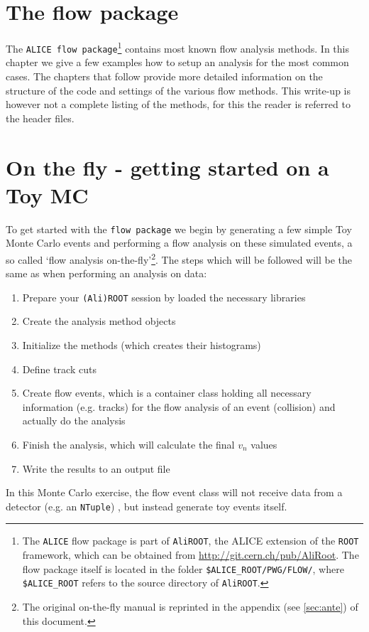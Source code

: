 \documentclass[a4paper]{book}
\numberwithin{equation}{subsection}
\begin{document}
\section{The flow package}
\label{quickstart}
The \texttt{ALICE flow package}\footnote{The \texttt{ALICE} flow package is part of \texttt{AliROOT}, the ALICE extension of the \texttt{ROOT} framework, which can be obtained from \href{http://git.cern.ch/pub/AliRoot}{http://git.cern.ch/pub/AliRoot}. The flow package itself is located in the folder \texttt{\$ALICE\_ROOT/PWG/FLOW/}, where \texttt{\$ALICE\_ROOT} refers to the source directory of \texttt{AliROOT}.} 
contains most known flow analysis methods.  In this chapter we give a few examples how to setup an
analysis for the most common cases. The chapters that follow provide more detailed information on the structure of the code 
and settings of the various flow methods. 
This write-up is however not a complete listing of the methods, for this the reader is referred to the header files.
 
\section{On the fly - getting started on a Toy MC}
To get started with the \texttt{flow package} we begin by generating a few simple Toy Monte Carlo events and performing a flow analysis on these simulated events, a so called `flow analysis on-the-fly'\footnote{The original on-the-fly manual is reprinted in the appendix (see \ref{sec:ante}) of this document.}. The steps which will be followed will be the same as when performing an analysis on data: 
\begin{enumerate}
\item Prepare your \texttt{(Ali)ROOT} session by loaded the necessary libraries
\item Create the analysis method objects
\item Initialize the methods (which creates their histograms)
\item Define track cuts
\item Create flow events, which is a container class holding all necessary information (e.g. tracks) for the flow analysis of an event (collision) and actually do the analysis
\item Finish the analysis, which will calculate the final $v_n$ values
\item Write the results to an output file
\end{enumerate}
In this Monte Carlo exercise, the flow event class will not receive data from a detector (e.g. an \texttt{NTuple}) , but instead generate toy events itself. 
\end{document}
